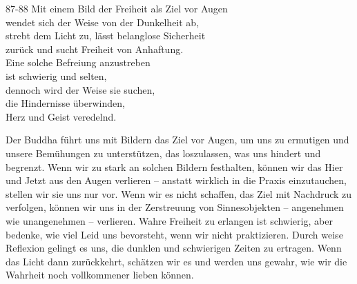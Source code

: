 
\begin{dhpVerse}{87-88}
\label{dhp-87}\label{dhp-88}
Mit einem Bild der Freiheit als Ziel vor Augen\\ 
wendet sich der Weise von der Dunkelheit ab, \\ 
strebt dem Licht zu, lässt belanglose Sicherheit\\ 
zurück und sucht Freiheit von Anhaftung.\\ 
Eine solche Befreiung anzustreben\\ 
ist schwierig und selten,\\ 
dennoch wird der Weise sie suchen,\\ 
die Hindernisse überwinden,\\ 
Herz und Geist veredelnd. 
\end{dhpVerse}

\begin{dhpRefl}

Der Buddha führt uns mit Bildern das Ziel vor Augen, um uns zu ermutigen und
unsere Bemühungen zu unterstützen, das loszulassen, was uns hindert und
begrenzt. Wenn wir zu stark an solchen Bildern festhalten, können wir das Hier
und Jetzt aus den Augen verlieren – anstatt wirklich in die Praxis
einzutauchen, stellen wir sie uns nur vor. Wenn wir es nicht schaffen, das
Ziel mit Nachdruck zu verfolgen, können wir uns in der Zerstreuung von
Sinnesobjekten – angenehmen wie unangenehmen – verlieren. Wahre Freiheit zu
erlangen ist schwierig, aber bedenke, wie viel Leid uns bevorsteht, wenn wir
nicht praktizieren. Durch weise Reflexion gelingt es uns, die dunklen und
schwierigen Zeiten zu ertragen. Wenn das Licht dann zurückkehrt, schätzen wir
es und werden uns gewahr, wie wir die Wahrheit noch vollkommener lieben
können.

\end{dhpRefl}
